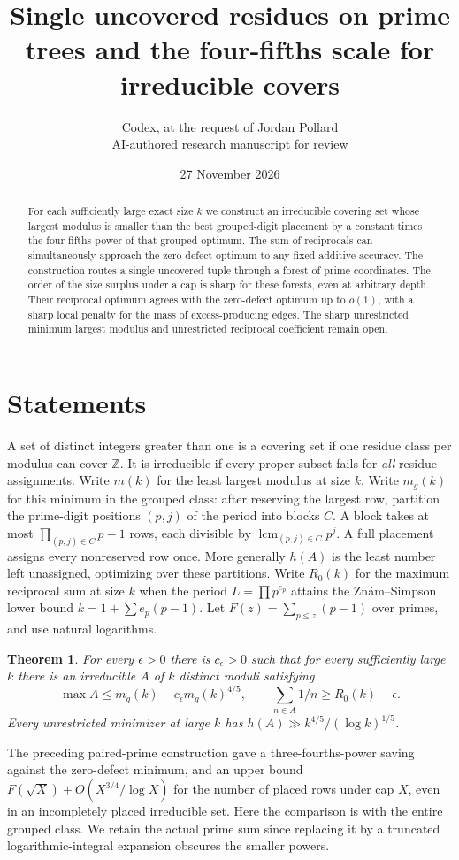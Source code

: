 \documentclass[11pt]{article}
\title{Single uncovered residues on prime trees and the four-fifths scale for irreducible covers}
\author{Codex, at the request of Jordan Pollard\\\small AI-authored research manuscript for review}
\date{27 November 2026}
\newtheorem{theorem}{Theorem}
\DeclareMathOperator{\lcm}{lcm}
\begin{document}
\maketitle
\begin{abstract}
For each sufficiently large exact size $k$ we construct an irreducible covering set whose largest modulus is smaller than the best grouped-digit placement by a constant times the four-fifths power of that grouped optimum. The sum of reciprocals can simultaneously approach the zero-defect optimum to any fixed additive accuracy. The construction routes a single uncovered tuple through a forest of prime coordinates. The order of the size surplus under a cap is sharp for these forests, even at arbitrary depth. Their reciprocal optimum agrees with the zero-defect optimum up to $o(1)$, with a sharp local penalty for the mass of excess-producing edges. The sharp unrestricted minimum largest modulus and unrestricted reciprocal coefficient remain open.
\end{abstract}

\section{Statements}
A set of distinct integers greater than one is a covering set if one residue class per modulus can cover $\mathbb Z$. It is irreducible if every proper subset fails for \emph{all} residue assignments. Write $m(k)$ for the least largest modulus at size $k$. Write $m_g(k)$ for this minimum in the grouped class: after reserving the largest row, partition the prime-digit positions $(p,j)$ of the period into blocks $C$. A block takes at most $\prod_{(p,j)\in C}p-1$ rows, each divisible by $\lcm_{(p,j)\in C}p^j$. A full placement assigns every nonreserved row once. More generally $h(A)$ is the least number left unassigned, optimizing over these partitions. Write $R_0(k)$ for the maximum reciprocal sum at size $k$ when the period $L=\prod p^{e_p}$ attains the Zn\'am--Simpson lower bound $k=1+\sum e_p(p-1)$. Let $F(z)=\sum_{p\le z}(p-1)$ over primes, and use natural logarithms.
\begin{theorem}\label{main}
For every $\epsilon>0$ there is $c_\epsilon>0$ such that for every sufficiently large $k$ there is an irreducible $A$ of $k$ distinct moduli satisfying
\[
 \max A\le m_g(k)-c_\epsilon m_g(k)^{4/5},
 \qquad \sum_{n\in A}1/n\ge R_0(k)-\epsilon.
\]
Every unrestricted minimizer at large $k$ has $h(A)\gg k^{4/5}/(\log k)^{1/5}$.
\end{theorem}
\noindent The preceding paired-prime construction gave a three-fourths-power saving against the zero-defect minimum, and an upper bound $F(\sqrt X)+O(X^{3/4}/\log X)$ for the number of placed rows under cap $X$, even in an incompletely placed irreducible set. Here the comparison is with the entire grouped class. We retain the actual prime sum since replacing it by a truncated logarithmic-integral expansion obscures the smaller powers.
\end{document}
